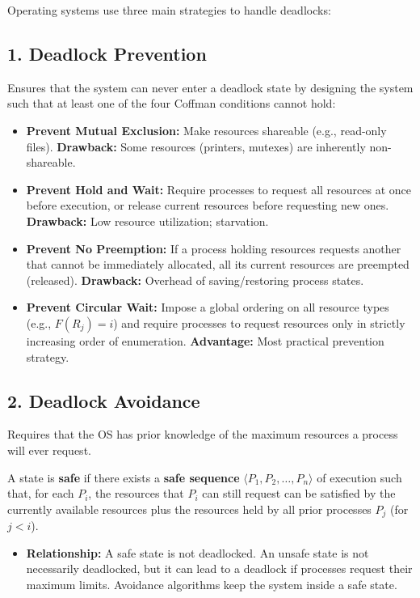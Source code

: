 \documentclass[12pt,a4paper]{article}
\begin{document}
Operating systems use three main strategies to handle deadlocks:

\subsection{1. Deadlock Prevention}
Ensures that the system can never enter a deadlock state by designing the system such that at least one of the four Coffman conditions cannot hold:
\begin{itemize}[leftmargin=*, itemsep=3pt]
  \item \textbf{Prevent Mutual Exclusion:} Make resources shareable (e.g., read-only files). \textbf{Drawback:} Some resources (printers, mutexes) are inherently non-shareable.
  \item \textbf{Prevent Hold and Wait:} Require processes to request all resources at once before execution, or release current resources before requesting new ones. \textbf{Drawback:} Low resource utilization; starvation.
  \item \textbf{Prevent No Preemption:} If a process holding resources requests another that cannot be immediately allocated, all its current resources are preempted (released). \textbf{Drawback:} Overhead of saving/restoring process states.
  \item \textbf{Prevent Circular Wait:} Impose a global ordering on all resource types (e.g., $F(R_j) = i$) and require processes to request resources only in strictly increasing order of enumeration. \textbf{Advantage:} Most practical prevention strategy.
\end{itemize}

\subsection{2. Deadlock Avoidance}
Requires that the OS has prior knowledge of the maximum resources a process will ever request.

\begin{tcolorbox}[defbox, title={\textbf{Safe State vs Unsafe State}}]
A state is \textbf{safe} if there exists a \textbf{safe sequence} $\langle P_1, P_2, \dots, P_n \rangle$ of execution such that, for each $P_i$, the resources that $P_i$ can still request can be satisfied by the currently available resources plus the resources held by all prior processes $P_j$ (for $j < i$).
\end{tcolorbox}

\begin{itemize}[leftmargin=*, itemsep=3pt]
  \item \textbf{Relationship:} A safe state is not deadlocked. An unsafe state is not necessarily deadlocked, but it can lead to a deadlock if processes request their maximum limits. Avoidance algorithms keep the system inside a safe state.
\end{itemize}
\end{document}

